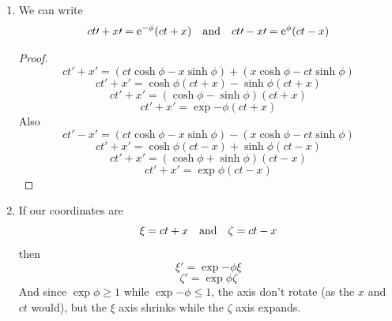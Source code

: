 \documentclass[oneside, 10pt, notitlepage]{book}
\begin{document}
\begin{enumerate}
        
        
    \item We can write 
        \begin{equation}ct{\prime}+ x{\prime}= \exp{-\phi} (ct + x) \qq{and} ct{\prime} - x{\prime} = \exp{\phi} (ct - x) \end{equation}
        \begin{proof}
        	\begin{equation}ct{\prime}+ x{\prime} = (ct \cosh \phi - x \sinh \phi) + (x \cosh \phi - ct \sinh \phi)\end{equation}
        	\begin{equation}ct{\prime}+ x{\prime} = \cosh \phi (ct + x) - \sinh \phi (ct + x)\end{equation}
        	\begin{equation}ct{\prime} + x{\prime}= (\cosh \phi - \sinh \phi)(ct+x)\end{equation}
        	\begin{equation}ct{\prime}+ x{\prime}= \exp{-\phi}(ct+x)\end{equation}
        	Also
        	\begin{equation}ct{\prime}- x{\prime} = (ct \cosh \phi - x \sinh \phi) - (x \cosh \phi - ct \sinh \phi)\end{equation}
        	\begin{equation}ct{\prime}+ x{\prime} = \cosh \phi (ct - x) + \sinh \phi (ct - x)\end{equation}
        	\begin{equation}ct{\prime} + x{\prime}= (\cosh \phi + \sinh \phi)(ct-x)\end{equation}
        	\begin{equation}ct{\prime}+ x{\prime}= \exp{\phi}(ct-x)\end{equation}
        \end{proof}

    \item If our coordinates are
        \begin{equation}\xi = ct+x \qq{and} \zeta = ct-x\end{equation}
        then
        \begin{equation}\xi{\prime} = \exp{-\phi}\xi\end{equation}
        \begin{equation}\zeta{\prime} = \exp{\phi}\zeta\end{equation}
        And since \(\exp{\phi}\geq1\) while \(\exp{-\phi}\leq1\), the axis don't rotate (as the \(x\) and \(ct\) would), but the \(\xi\) axis shrinks while the \(\zeta\) axis expands.  
        

\end{enumerate}
\end{document}
